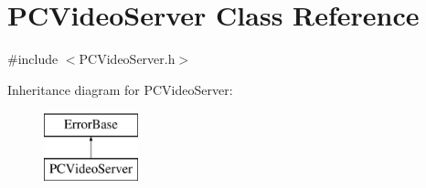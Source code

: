 \hypertarget{classPCVideoServer}{
\section{PCVideoServer Class Reference}
\label{classPCVideoServer}
}


{\ttfamily \#include $<$PCVideoServer.h$>$}

Inheritance diagram for PCVideoServer:\begin{figure}[H]
\begin{center}
\leavevmode
\includegraphics[height=2.000000cm]{classPCVideoServer}
\end{center}
\end{figure}
